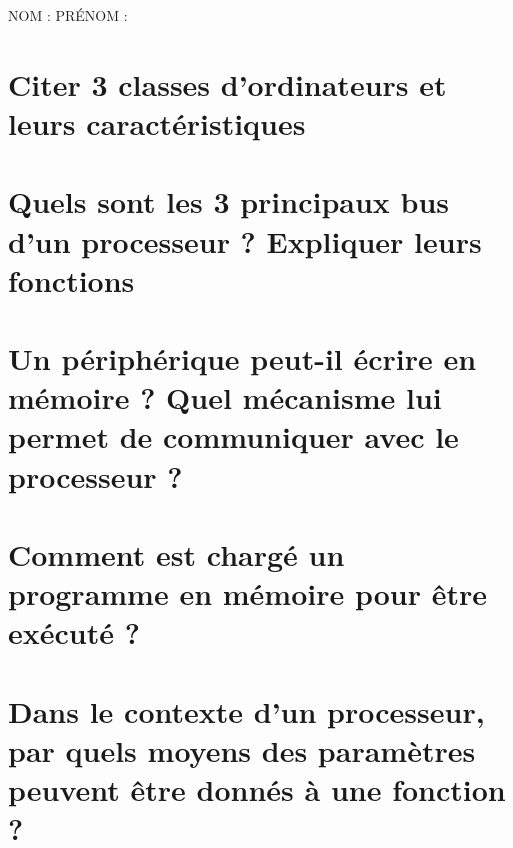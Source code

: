 \documentclass[11pt,a4paper]{article}
\author{Fabrice BOISSIER}
\begin{document}
\setlength{\fboxrule}{2pt}

\noindent {}

\bigskip

NOM : \hspace{6.5cm} PR\'ENOM :

\smallskip

\section{Citer 3 classes d'ordinateurs et leurs caractéristiques}

\bigskip
\bigskip
\bigskip
\bigskip
\bigskip
\bigskip
\bigskip
\bigskip

\section{Quels sont les 3 principaux bus d'un processeur ? Expliquer leurs fonctions}

\bigskip
\bigskip
\bigskip
\bigskip
\bigskip
\bigskip
\bigskip
\bigskip

\section{Un périphérique peut-il écrire en mémoire ? Quel mécanisme lui permet de communiquer avec le processeur ?}

\bigskip
\bigskip
\bigskip

\section{Comment est chargé un programme en mémoire pour être exécuté ?}

\bigskip
\bigskip
\bigskip
\bigskip
\bigskip
\bigskip
\bigskip
\bigskip

\section{Dans le contexte d'un processeur, par quels moyens des paramètres peuvent être donnés à une fonction ?}


\end{document}
